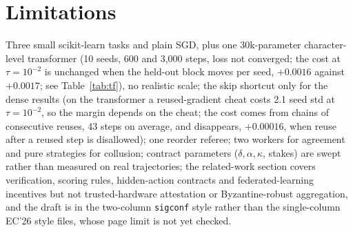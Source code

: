 \documentclass[sigconf,anonymous]{acmart}
\begin{document}
\section{Limitations}
Three small scikit-learn tasks and plain SGD, plus one 30k-parameter character-level transformer (10 seeds, 600 and 3,000 steps, loss not converged; the cost at $\tau=10^{-2}$ is unchanged when the held-out block moves per seed, $+0.0016$ against $+0.0017$; see Table~\ref{tab:tf}), no realistic scale; the skip shortcut only for the dense results (on the transformer a reused-gradient cheat costs 2.1 seed std at $\tau=10^{-2}$, so the margin depends on the cheat; the cost comes from chains of consecutive reuses, 43 steps on average, and disappears, $+0.00016$, when reuse after a reused step is disallowed); one reorder
referee; two workers for agreement and pure strategies for collusion; contract parameters ($\delta,\alpha,\kappa$, stakes)
are swept rather than measured on real trajectories; the related-work section covers verification, scoring rules, hidden-action contracts and federated-learning incentives but not trusted-hardware attestation or Byzantine-robust aggregation, and the draft is in the
two-column \texttt{sigconf} style rather than the single-column EC'26 style files, whose page limit is not yet checked.


\end{document}
